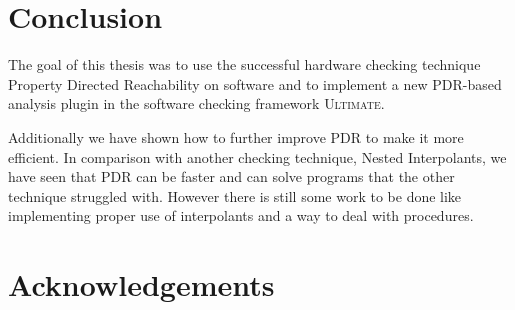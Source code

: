 \documentclass[11pt, a4paper, BCOR=10mm, ngerman]{scrbook}
\begin{document}
%    
%    
%    
%    
%    
%    
%    
%    
%    
%    
%
%    
%
%
%
%
%
%
%


\chapter{Conclusion}
The goal of this thesis was to use the successful hardware checking technique Property Directed Reachability on software and to implement a new PDR-based analysis plugin in the software checking framework \textsc{Ultimate}. \par Additionally we have shown how to further improve PDR to make it more efficient. In comparison with another checking technique, Nested Interpolants, we have seen that PDR can be faster and can solve programs that the other technique struggled with. However there is still some work to be done like implementing proper use of interpolants and a way to deal with procedures.


\chapter*{Acknowledgements}




\end{document}
